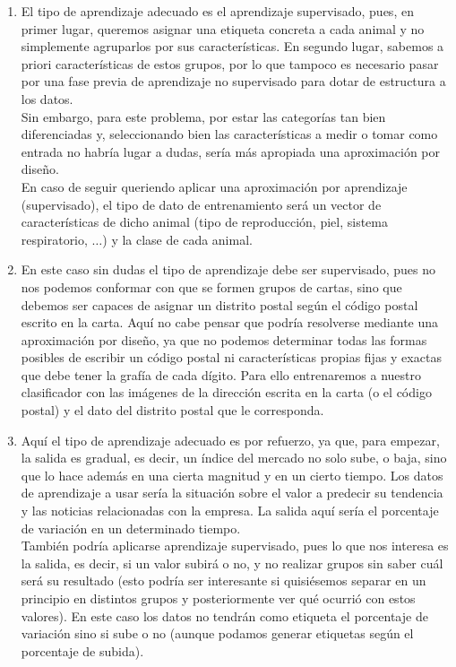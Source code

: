 \documentclass[11pt,leqno]{article}
\theoremstyle{definition}
\begin{document}
\begin{solucion}
\begin{enumerate}[a]
\item El tipo de aprendizaje adecuado es el aprendizaje supervisado, pues, en primer lugar, queremos asignar una etiqueta concreta a cada animal y no  simplemente agruparlos por sus características. En segundo lugar, sabemos a priori características de estos grupos, por lo que tampoco es necesario pasar por una fase previa de aprendizaje no supervisado para dotar de estructura a los datos.\\
Sin embargo, para este problema, por estar las categorías tan bien diferenciadas y, seleccionando bien las características a medir o tomar como entrada no habría lugar a dudas, sería más apropiada una aproximación por diseño.\\
En caso de seguir queriendo aplicar una aproximación por aprendizaje (supervisado), el tipo de dato de entrenamiento será un vector de características de dicho animal (tipo de reproducción, piel, sistema respiratorio, $\dots$) y la clase de cada animal.
\item En este caso sin dudas el tipo de aprendizaje debe ser supervisado, pues no nos podemos conformar con que se formen grupos de cartas, sino que debemos ser capaces de asignar un distrito postal según el código postal escrito en la carta. Aquí no cabe pensar que podría resolverse mediante una aproximación por diseño, ya que no podemos determinar todas las formas posibles de escribir un código postal ni características propias fijas y exactas que debe tener la grafía de cada dígito. Para ello entrenaremos a nuestro clasificador con las imágenes de la dirección escrita en la carta (o el código postal) y el dato del distrito postal que le corresponda.
\item Aquí el tipo de aprendizaje adecuado es por refuerzo, ya que, para empezar, la salida es gradual, es decir, un índice del mercado no solo sube, o baja, sino que lo hace además en una cierta magnitud y en un cierto tiempo. Los datos de aprendizaje a usar sería la situación sobre el valor a predecir su tendencia y las noticias relacionadas con la empresa. La salida aquí sería el porcentaje de variación en un determinado tiempo.\\
También podría aplicarse aprendizaje supervisado, pues lo que nos interesa es la salida, es decir, si un valor subirá o no, y no realizar grupos sin saber cuál será su resultado (esto podría ser interesante si quisiésemos separar en un principio en distintos grupos y posteriormente ver qué ocurrió con estos valores). En este caso los datos no tendrán como etiqueta el porcentaje de variación sino si sube o no (aunque podamos generar etiquetas según el porcentaje de subida).
\end{enumerate}
\end{solucion}
\end{document}
